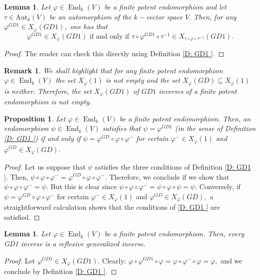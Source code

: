 \documentclass[10pt,a4paper]{amsart}
\newtheorem{lem}[defn]{Lemma}
\newtheorem{prop}[defn]{Proposition}
\theoremstyle{plain}
\newtheorem{rem}[defn]{Remark}
\theoremstyle{remark}
\numberwithin{equation}{section} \numberwithin{defn}{section}
\newcommand\ed{\operatorname{End}}
\newcommand{\f}{\varphi}
\newcommand{\g}{\psi}
\begin{document}
\begin{lem}\label{L: GD1 inv conj}
Let $\f \in \ed_k(V)$ be a finite potent endomorphism and let $\tau \in \mathrm{Aut}_k(V)$ be an automorphism of the $k-$vector space $V.$ Then, for any $\f^{GD1}\in X_{\f}(GD1),$ one has that $$\f^{GD1}\in X_{\f}(GD1) \text{ if and only if }\tau \circ \f^{GD1} \circ \tau^{-1}\in X_{\tau \circ \f \circ \tau^{-1}}(GD1). $$ 
\end{lem}
\begin{proof}
The reader can check this directly using Definition \ref{D: GD1 }.
\end{proof}



\begin{rem}
We shall highlight that for any finite potent endomorphism $\f\in \ed_k(V)$ the set $X_{\f}(1)$ is not empty and the set $X_{\f}(GD)\subseteq X_{\f}(1)$ is neither. Therefore, the set $X_{\f}(GD1)$ of $GD1$ inverses of a finite potent endomorphism is not empty.
\end{rem}


\begin{prop}\label{T: Charact Algebraica}
Let $\f \in \ed_k(V)$ be a finite potent endomorphism. Then, an endomorphism $\g\in \ed_k(V)$ satisfies that $\g=\f^{GD1}$ (in the sense of Definition \ref{D: GD1 }) if and only if $\g=\f^{GD}\circ \f\circ \f^{-}$ for certain $\f^-\in X_{\f}(1)$ and $\f^{GD}\in X_{\f}(GD).$ 
\end{prop}
\begin{proof}
Let us suppose that $\g$ satisfies the three conditions of Definition \ref{D: GD1 }. Then, $\g\circ \f \circ \f^-=\f^{GD}\circ \f \circ \f^-.$ Therefore, we conclude if we show that $\g\circ \f \circ \f^-=\g.$ But this is clear since $\g\circ \f \circ \f^-=\g\circ \f \circ \g=\g.$ Conversely, if $\g=\f^{GD}\circ \f \circ \f^-$ for certain $\f^-\in X_{\f}(1)$ and $\f^{GD}\in X_{\f}(GD),$ a straightforward calculation shows that the conditions of \ref{D: GD1 } are satisfied.
\end{proof}


\begin{lem}\label{L: GD1 son reflex}
Let $\f \in \ed_k(V)$ be a finite potent endomorphism. Then, every GD1 inverse is a reflexive generalized inverse.
\end{lem}
\begin{proof}
Let $\f^{GD1}\in X_{\f}(GD1).$ Clearly:
$\f \circ \f^{GD1}\circ \f = \f \circ \f^{-}\circ \f=\f, $ and we conclude by Definition \ref{D: GD1 }.
\end{proof}
\end{document}

